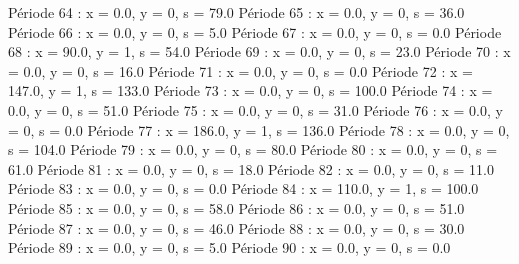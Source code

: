 Période 64 : x = 0.0, y = 0, s = 79.0
Période 65 : x = 0.0, y = 0, s = 36.0
Période 66 : x = 0.0, y = 0, s = 5.0
Période 67 : x = 0.0, y = 0, s = 0.0
Période 68 : x = 90.0, y = 1, s = 54.0
Période 69 : x = 0.0, y = 0, s = 23.0
Période 70 : x = 0.0, y = 0, s = 16.0
Période 71 : x = 0.0, y = 0, s = 0.0
Période 72 : x = 147.0, y = 1, s = 133.0
Période 73 : x = 0.0, y = 0, s = 100.0
Période 74 : x = 0.0, y = 0, s = 51.0
Période 75 : x = 0.0, y = 0, s = 31.0
Période 76 : x = 0.0, y = 0, s = 0.0
Période 77 : x = 186.0, y = 1, s = 136.0
Période 78 : x = 0.0, y = 0, s = 104.0
Période 79 : x = 0.0, y = 0, s = 80.0
Période 80 : x = 0.0, y = 0, s = 61.0
Période 81 : x = 0.0, y = 0, s = 18.0
Période 82 : x = 0.0, y = 0, s = 11.0
Période 83 : x = 0.0, y = 0, s = 0.0
Période 84 : x = 110.0, y = 1, s = 100.0
Période 85 : x = 0.0, y = 0, s = 58.0
Période 86 : x = 0.0, y = 0, s = 51.0
Période 87 : x = 0.0, y = 0, s = 46.0
Période 88 : x = 0.0, y = 0, s = 30.0
Période 89 : x = 0.0, y = 0, s = 5.0
Période 90 : x = 0.0, y = 0, s = 0.0

